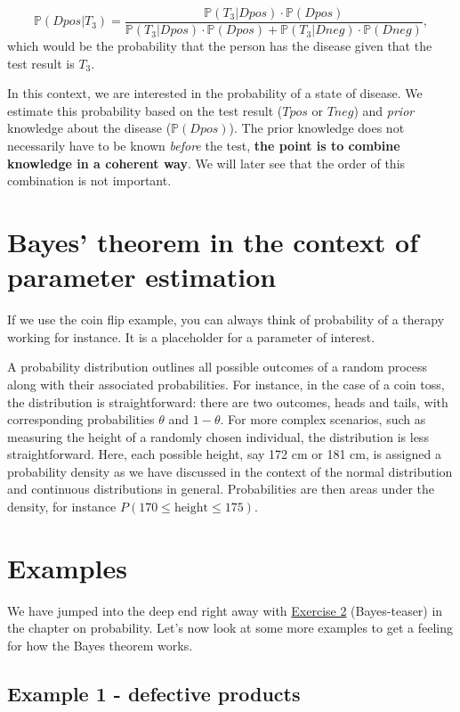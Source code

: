 \documentclass[
]{book}
\begin{document}
\[
\mathbb{P}(Dpos|T_3) = \frac{\mathbb{P}(T_3|Dpos) \cdot 
\mathbb{P}(Dpos)}{\mathbb{P}(T_3|Dpos) \cdot \mathbb{P}(Dpos) + \mathbb{P}(T_3|Dneg) \cdot \mathbb{P}(Dneg)},
\]
which would be the probability that the person has the disease given that the test result is \(T_3\).

In this context, we are interested in the probability of a state of disease.
We estimate this probability based on the test result (\(Tpos\) or \(Tneg\)) and \emph{prior} knowledge about the disease (\(\mathbb{P}(Dpos)\)).
The prior knowledge does not necessarily have to be known \emph{before} the test, \textbf{the point is to combine knowledge in a coherent way}. We will
later see that the order of this combination is not important.

\section{Bayes' theorem in the context of parameter estimation}\label{bayes-theorem-in-the-context-of-parameter-estimation}

If we use the coin flip example, you can always think of probability of a therapy working for instance.
It is a placeholder for a parameter of interest.

A probability distribution outlines all possible outcomes of a random process along with their associated probabilities.
For instance, in the case of a coin toss, the distribution is straightforward: there are two outcomes,
heads and tails, with corresponding probabilities \(\theta\) and \(1-\theta\).
For more complex scenarios, such as measuring the height of a randomly chosen individual,
the distribution is less straightforward. Here, each possible height, say 172 cm or 181 cm,
is assigned a probability density as we have discussed in the context of the normal distribution and continuous distributions
in general. Probabilities are then areas under the density, for instance \(P(170 \le \text{height} \le 175)\).

\section{Examples}\label{examples}

We have jumped into the deep end right away with \hyperref[exercise2]{Exercise 2} (Bayes-teaser) in the chapter on probability. Let's now look at some more examples to get a feeling for
how the Bayes theorem works.

\subsection{Example 1 - defective products}\label{example_defective_products}
\end{document}
